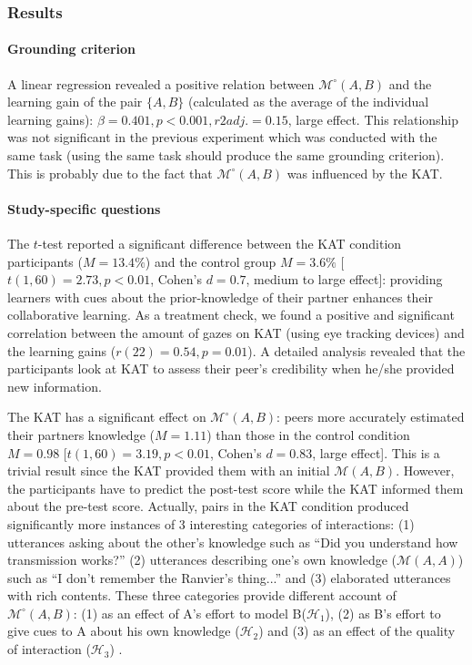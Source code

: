 \documentclass[natbib]{svjour3}
\newcommand{\A}{A\xspace}
\newcommand{\B}{B\xspace}
\newcommand{\gmodel}[2]{{$\mathcal{M}(#1, #2)$}}
\newcommand{\gModel}[2]{{$\mathcal{M}^{\circ}(#1, #2)$}}
\begin{document}
\subsubsection*{Results}

\paragraph{Grounding criterion} A linear regression revealed a positive relation
between \gModel{A}{B} and the learning gain of the pair $\{A, B\}$ (calculated
as the average of the individual learning gains): $\beta= 0.401, p < 0.001, r2adj.
= 0.15$, large effect. This relationship was not significant in the previous
experiment which was conducted with the same task (using the same task
should produce the same grounding criterion). This is probably due to the fact that
\gModel{A}{B} was influenced by the KAT.

\paragraph{Study-specific questions} The $t$-test reported a significant
difference between the KAT condition participants ($M = 13.4\%$) and the control
group $M = 3.6\%$ [$t(1, 60) = 2.73, p < 0.01$, Cohen's $d = 0.7$, medium to large
effect]: providing learners with cues about the prior-knowledge of their partner
enhances their collaborative learning. As a treatment check, we found a positive
and significant correlation between the amount of gazes on KAT (using eye
tracking devices) and the learning gains ($r(22) = 0.54, p = 0.01$). A detailed
analysis revealed that the participants look at KAT to assess their peer's credibility
when he/she provided new information. 

The KAT has a significant effect on \gModel{A}{B}: peers more accurately
estimated their partners knowledge ($M = 1.11$) than those in the control
condition $M = 0.98$ [$t(1, 60) = 3.19, p < 0.01$, Cohen's $d = 0.83$, large
effect]. This is a trivial result since the KAT provided them with an initial
\gmodel{A}{B}. However, the participants have to predict the post-test score while the
KAT informed them about the pre-test score. Actually, pairs in the KAT condition
produced significantly more instances of 3 interesting categories of
interactions: (1) utterances asking about the other's knowledge such as ``Did
you understand how transmission works?'' (2) utterances describing one's own
knowledge (\gmodel{A}{A}) such as ``I don't remember the Ranvier's thing...''
and (3) elaborated utterances with rich contents. These three categories provide
different account of \gModel{A}{B}: (1) as an effect of \A's effort to model
\B  ($\mathcal{H}_{1}$), (2) as \B's effort to give cues to \A about his own
knowledge ($\mathcal{H}_{2}$) and (3) as an effect of the quality of
interaction ($\mathcal{H}_{3}$) .
\end{document}
